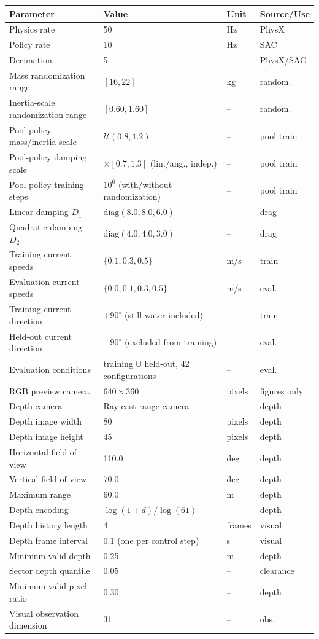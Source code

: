 \documentclass[11pt]{article}
\begin{document}
\begin{center}
\footnotesize
\begin{tabularx}{\textwidth}{@{}Z M M Z@{}}
\toprule
Parameter & Value & Unit & Source/Use \\
\midrule
Physics rate & 50 & Hz & PhysX \\
Policy rate & 10 & Hz & SAC \\
Decimation & 5 & -- & PhysX/SAC \\
Mass randomization range & $[16,22]$ & kg & random. \\
Inertia-scale randomization range & $[0.60,1.60]$ & -- & random. \\
Pool-policy mass/inertia scale & $\mathcal{U}(0.8,1.2)$ & -- & pool train \\
Pool-policy damping scale & $\times[0.7,1.3]$ (lin./ang., indep.) & -- & pool train \\
Pool-policy training steps & $10^6$ (with/without randomization) & -- & pool train \\
Linear damping $D_1$ & $\mathrm{diag}(8.0,8.0,6.0)$ & -- & drag \\
Quadratic damping $D_2$ & $\mathrm{diag}(4.0,4.0,3.0)$ & -- & drag \\
Training current speeds & $\{0.1,0.3,0.5\}$ & m/s & train \\
Evaluation current speeds & $\{0.0,0.1,0.3,0.5\}$ & m/s & eval. \\
Training current direction & $+90^{\circ}$ (still water included) & -- & train \\
Held-out current direction & $-90^{\circ}$ (excluded from training) & -- & eval. \\
Evaluation conditions & training $\cup$ held-out, 42 configurations & -- & eval. \\
RGB preview camera & $640\times360$ & pixels & figures only \\
Depth camera & Ray-cast range camera & -- & depth \\
Depth image width & 80 & pixels & depth \\
Depth image height & 45 & pixels & depth \\
Horizontal field of view & 110.0 & deg & depth \\
Vertical field of view & 70.0 & deg & depth \\
Maximum range & 60.0 & m & depth \\
Depth encoding & $\log(1+d)/\log(61)$ & -- & depth \\
Depth history length & 4 & frames & visual \\
Depth frame interval & 0.1 (one per control step) & s & visual \\
Minimum valid depth & 0.25 & m & depth \\
Sector depth quantile & 0.05 & -- & clearance \\
Minimum valid-pixel ratio & 0.30 & -- & depth \\
Visual observation dimension & 31 & -- & obs. \\
\bottomrule
\end{tabularx}
\end{center}
\end{document}
